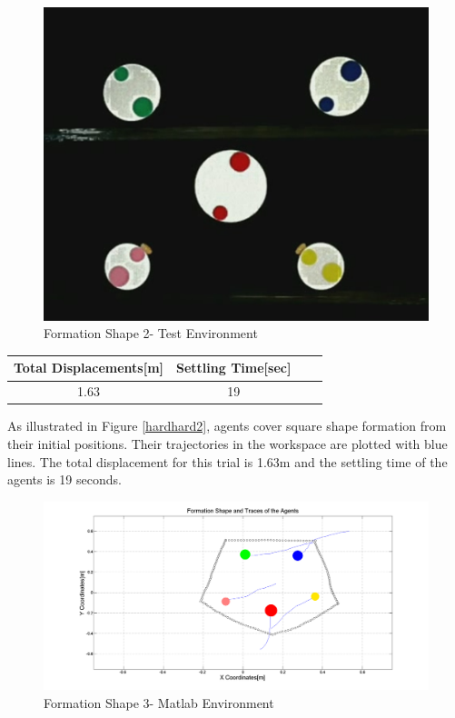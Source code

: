 \begin{figure}[H]
\caption{Formation Shape 2- Test Environment}
\centerline{\includegraphics[scale = 0.35]{4_real_hardware}}
\end{figure} 
					
\begin{center}
 \label{hardwareshape2_ref} 
\begin{tabular}{||c| c |c |c ||}
\hline
\textbf{Total Displacements[m]}  & \textbf{Settling Time[sec]}\\ 
\hline
1.63 & 19 \\
\hline
\end{tabular}
\end{center}

As illustrated in Figure \ref{hardhard2}, agents cover square shape formation from their initial positions. Their trajectories in the workspace are plotted with blue lines. The total displacement for this trial is 1.63m and the settling time of the agents is 19 seconds.	
				
\begin{figure}[H]
\caption{Formation Shape 3- Matlab Environment} \label{hardhard3}
\centerline{\includegraphics[scale = 0.32]{5_hardware}}
\end{figure} 
					
